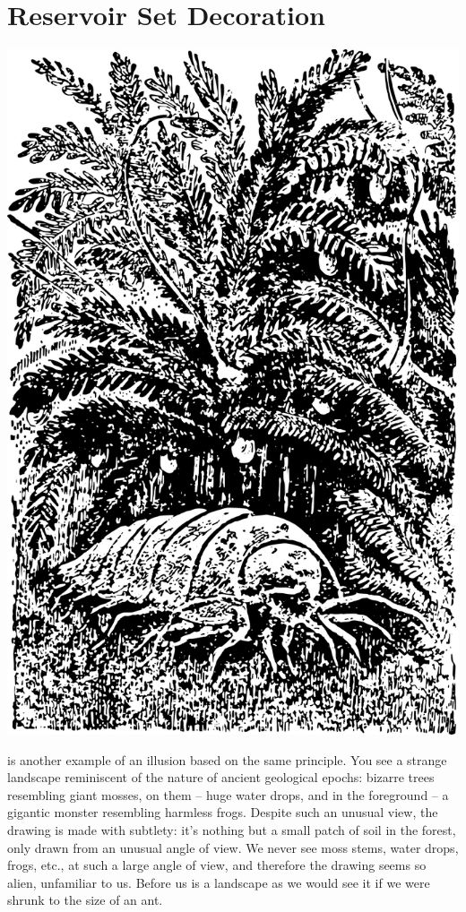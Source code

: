 \section{Reservoir Set Decoration}
\label{sec-3.6}
\begin{marginfigure}[-5.5cm]%
\centering
\includegraphics[width=\textwidth]{figures/ch-03/fig-066.pdf}
\end{marginfigure}


 is another example of an illusion based on the same principle. You see a strange landscape reminiscent of the nature of ancient geological epochs: bizarre trees resembling giant mosses, on them -- huge water drops, and in the foreground -- a gigantic monster resembling harmless frogs. Despite such an unusual view, the drawing is made with subtlety: it's nothing but a small patch of soil in the forest, only drawn from an unusual angle of view. We never see moss stems, water drops, frogs, etc., at such a large angle of view, and therefore the drawing seems so alien, unfamiliar to us. Before us is a landscape as we would see it if we were shrunk to the size of an ant. 


